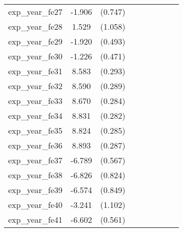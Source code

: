 {\begin{tabular}{l*{4}{cc}}
exp\_year\_fe27&   -1.906\sym{*}  &  (0.747)&                  &         &                  &         &                  &         \\
exp\_year\_fe28&    1.529         &  (1.058)&                  &         &                  &         &                  &         \\
exp\_year\_fe29&   -1.920\sym{***}&  (0.493)&                  &         &                  &         &                  &         \\
exp\_year\_fe30&   -1.226\sym{**} &  (0.471)&                  &         &                  &         &                  &         \\
exp\_year\_fe31&    8.583\sym{***}&  (0.293)&                  &         &                  &         &                  &         \\
exp\_year\_fe32&    8.590\sym{***}&  (0.289)&                  &         &                  &         &                  &         \\
exp\_year\_fe33&    8.670\sym{***}&  (0.284)&                  &         &                  &         &                  &         \\
exp\_year\_fe34&    8.831\sym{***}&  (0.282)&                  &         &                  &         &                  &         \\
exp\_year\_fe35&    8.824\sym{***}&  (0.285)&                  &         &                  &         &                  &         \\
exp\_year\_fe36&    8.893\sym{***}&  (0.287)&                  &         &                  &         &                  &         \\
exp\_year\_fe37&   -6.789\sym{***}&  (0.567)&                  &         &                  &         &                  &         \\
exp\_year\_fe38&   -6.826\sym{***}&  (0.824)&                  &         &                  &         &                  &         \\
exp\_year\_fe39&   -6.574\sym{***}&  (0.849)&                  &         &                  &         &                  &         \\
exp\_year\_fe40&   -3.241\sym{**} &  (1.102)&                  &         &                  &         &                  &         \\
exp\_year\_fe41&   -6.602\sym{***}&  (0.561)&                  &         &                  &         &                  &         \\

\end{tabular}}
